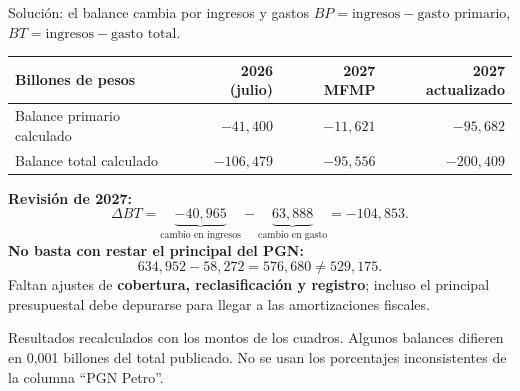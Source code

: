 \begin{frame}{Solución: el balance cambia por ingresos y gastos}
\small
\(BP=\text{ingresos}-\text{gasto primario}\),
\quad \(BT=\text{ingresos}-\text{gasto total}\).
\begin{center}
\begin{tabular}{@{}lrrr@{}}
\toprule
\textbf{Billones de pesos} & \textbf{2026 (julio)} & \textbf{2027 MFMP} & \textbf{2027 actualizado} \\
\midrule
Balance primario calculado & $-41{,}400$ & $-11{,}621$ & $-95{,}682$ \\
Balance total calculado & $-106{,}479$ & $-95{,}556$ & $-200{,}409$ \\
\bottomrule
\end{tabular}
\end{center}
\textbf{Revisión de 2027:}
\[
\Delta BT=\underbrace{-40{,}965}_{\text{cambio en ingresos}}
-\underbrace{63{,}888}_{\text{cambio en gasto}}
=\boxed{-104{,}853}.
\]
\textbf{No basta con restar el principal del PGN:}
\[
634{,}952-58{,}272=576{,}680\ne529{,}175.
\]
Faltan ajustes de \textbf{cobertura, reclasificación y registro}; incluso el principal presupuestal debe depurarse para llegar a las amortizaciones fiscales.
\vfill
{\fontsize{7.4}{8.8}\selectfont Resultados recalculados con los montos de los cuadros. Algunos balances difieren en 0,001 billones del total publicado. No se usan los porcentajes inconsistentes de la columna ``PGN Petro''.\par}
\end{frame}
